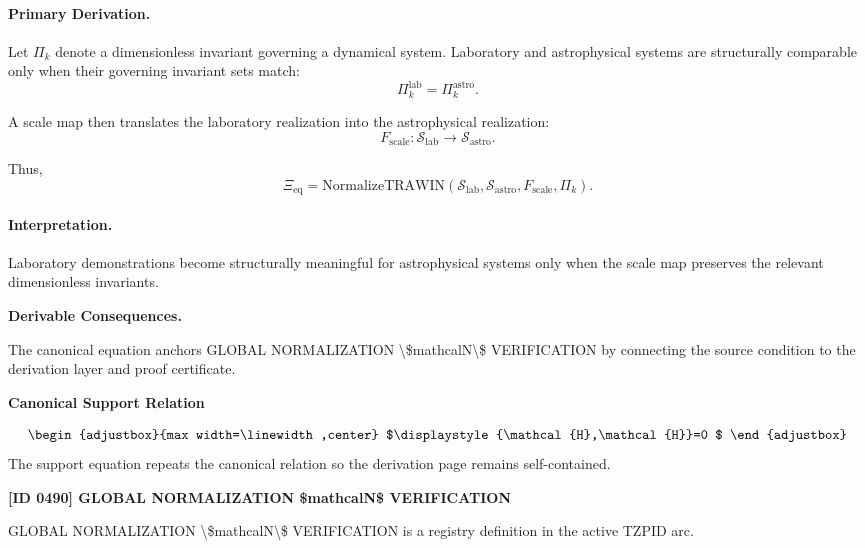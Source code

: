 \paragraph{Primary Derivation.}
Let $\Pi_k$ denote a dimensionless invariant governing a dynamical system.  
Laboratory and astrophysical systems are structurally comparable only when their governing invariant sets match:
\begin{equation}
\Pi_k^{\mathrm{lab}}
=
\Pi_k^{\mathrm{astro}} .
\end{equation}

A scale map then translates the laboratory realization into the astrophysical realization:
\begin{equation}
F_{\mathrm{scale}}:
\mathcal{S}_{\mathrm{lab}}
\to
\mathcal{S}_{\mathrm{astro}} .
\end{equation}

Thus,
\begin{equation}
\boxed{
\Xi_{\mathrm{eq}}
=
\mathrm{NormalizeTRAWIN}
\left(
\mathcal{S}_{\mathrm{lab}},
\mathcal{S}_{\mathrm{astro}},
F_{\mathrm{scale}},
\Pi_k
\right).
}
\end{equation}

\paragraph{Interpretation.}
Laboratory demonstrations become structurally meaningful for astrophysical systems only when the scale map preserves the relevant dimensionless invariants.

\par\vspace{0.35em}
\noindent\textbf{Derivable Consequences.}\quad
\begingroup
\footnotesize
\raggedright
The canonical equation anchors GLOBAL NORMALIZATION \textbackslash{}\$mathcalN\textbackslash{}\$ VERIFICATION by connecting the source condition to the derivation layer and proof certificate.
\par\endgroup

\noindent\textbf{Canonical Support Relation}\par
\[
\begin{adjustbox}{max width=\linewidth,center}
$\displaystyle
{\mathcal{H},\mathcal{H}}=0
$
\end{adjustbox}
\]
\noindent The support equation repeats the canonical relation so the derivation page remains self-contained.\par

\clearpage
\noindent\textbf{[ID 0490] GLOBAL NORMALIZATION \$mathcalN\$ VERIFICATION}\par
\vspace{0.35em}
\begingroup\small
{}
GLOBAL NORMALIZATION \textbackslash{}\$mathcalN\textbackslash{}\$ VERIFICATION is a registry definition in the active TZPID arc.

